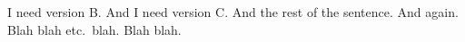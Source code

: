 \documentclass[12pt]{article}
\begin{document}
	\noindent
	I need version B\@. And I need version C\@. And the rest of the sentence. And again.
	\\[20pt]
	
	
	\noindent
	Blah blah etc.\ blah. Blah blah.
	
\end{document}
